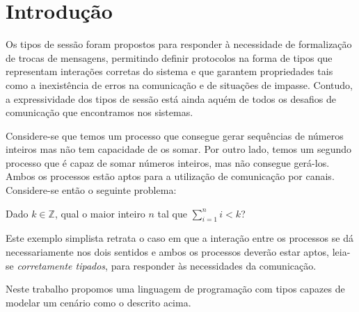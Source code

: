 \section{Introdução}

Os tipos de sessão foram propostos para responder à necessidade
de formalização de trocas de mensagens, permitindo definir protocolos 
na forma de tipos que representam interações corretas do sistema e que 
garantem propriedades tais como a inexistência de erros na comunicação 
e de situações de impasse. Contudo, a expressividade dos tipos de sessão
está ainda aquém de todos os desafios de comunicação que encontramos nos 
sistemas.

Considere-se que temos um processo que consegue gerar sequências de números
inteiros mas não tem capacidade de os somar. Por outro lado, temos um
segundo processo que é capaz de somar números inteiros, mas não consegue
gerá-los. Ambos os processos estão aptos para a utilização de comunicação
por canais. Considere-se então o seguinte problema:

\begin{example}
	Dado $k\in\mathbb{Z}$, qual o maior inteiro $n$ tal que
	$\sum_{i=1}^n i < k$?
\end{example}

Este exemplo simplista retrata o caso em que a interação entre
os processos se dá necessariamente nos dois sentidos e ambos 
os processos deverão
estar aptos, leia-se \emph{corretamente tipados}, para responder 
às necessidades da comunicação.

Neste trabalho propomos uma linguagem de programação
com tipos capazes de modelar um cenário como o descrito acima.

